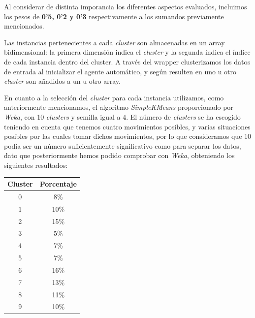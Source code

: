 \documentclass[12pt]{article}
\begin{document}
Al considerar de distinta imporancia los diferentes aspectos evaluados, incluimos los pesos de \textbf{0'5, 0'2 y 0'3} respectivamente a los sumandos previamente mencionados.


Las instancias pertenecientes a cada \textit{cluster} son almacenadas en un array bidimensional: la primera dimensión indica el \textit{cluster} y la segunda indica el índice de cada instancia dentro del cluster. A través del wrapper clusterizamos los datos de entrada al inicializar el agente automático, y según resulten en uno u otro \textit{cluster} son añadidos a un u otro array.


En cuanto a la selección del \textit{cluster} para cada instancia utilizamos, como anteriormente mencionamos, el algoritmo \textit{SimpleKMeans} proporcionado por \textit{Weka}, con 10 \textit{clusters} y semilla igual a 4. El número de \textit{clusters} se ha escogido teniendo en cuenta que tenemos cuatro movimientos posibles, y varias situaciones posibles por las cuales tomar dichos movimientos, por lo que consideramos que 10 podía ser un número suficientemente significativo como para separar los datos, dato que posteriormente hemos podido comprobar con \textit{Weka}, obteniendo los siguientes resultados:

\begin{center}
    \begin{tabular}{c | c}
        \hline
        Cluster & Porcentaje \\
        \hline
        0   &    8\% \\
        1   &   10\% \\
        2   &   15\% \\
        3   &    5\% \\
        4   &    7\% \\
        5   &    7\% \\
        6   &   16\% \\
        7   &   13\% \\
        8   &   11\% \\
        9   &   10\% \\
    \end{tabular}
\end{center}
\end{document}

